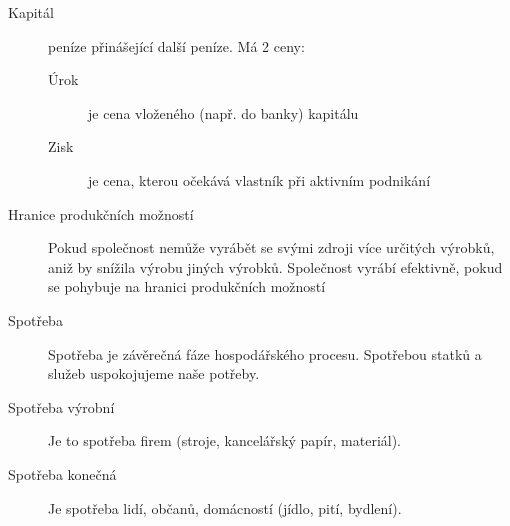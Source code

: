 \begin{description}
    \item[Kapitál] peníze přinášející další peníze. Má 2 ceny:
    \begin{description}
        \item[Úrok] je cena vloženého (např. do banky) kapitálu
        \item[Zisk] je cena, kterou očekává vlastník při aktivním podnikání
    \end{description}
    \item[Hranice produkčních možností] Pokud společnost nemůže vyrábět se svými zdroji více určitých výrobků, aniž by snížila výrobu jiných výrobků. Společnost vyrábí efektivně, pokud se pohybuje na hranici produkčních možností
    \item[Spotřeba] Spotřeba je závěrečná fáze hospodářského procesu. Spotřebou statků a služeb uspokojujeme naše potřeby.
    \item[Spotřeba výrobní] Je to spotřeba firem (stroje, kancelářský papír, materiál).
    \item[Spotřeba konečná] Je spotřeba lidí, občanů, domácností (jídlo, pití, bydlení).
\end{description}

